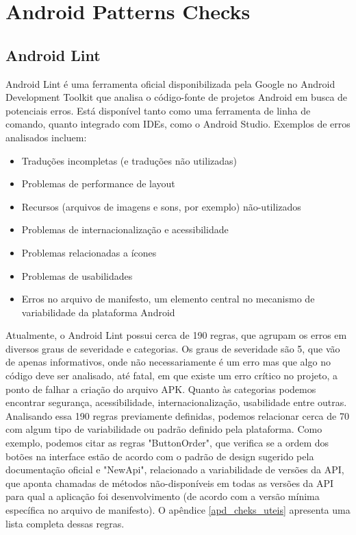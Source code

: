 \chapter{Android Patterns Checks}
\label{android_lint}
\section{Android Lint}

Android Lint é uma ferramenta oficial disponibilizada pela Google no Android 
Development Toolkit que analisa o código-fonte de projetos Android em busca de 
potenciais erros. Está disponível tanto como uma ferramenta de linha de comando, 
quanto integrado com IDEs, como o Android Studio. Exemplos de erros analisados incluem:

\begin{itemize}
  \item{Traduções incompletas (e traduções não utilizadas)}
  \item{Problemas de performance de layout}
  \item{Recursos (arquivos de imagens e sons, por exemplo) não-utilizados}
  \item{Problemas de internacionalização e acessibilidade}
  \item{Problemas relacionadas a ícones}
  \item{Problemas de usabilidades}
  \item{Erros no arquivo de manifesto, um elemento central no mecanismo de variabilidade
  da plataforma Android \cite{mechanisms}}
\end{itemize}

Atualmente, o Android Lint possui cerca de 190 regras, que agrupam os erros em 
diversos graus de severidade e categorias. Os graus de severidade são 5, que vão 
de apenas informativos, onde não necessariamente é um erro mas que algo no código 
deve ser analisado, até fatal, em que existe um erro crítico no projeto, a ponto 
de falhar a criação do arquivo APK. Quanto às categorias podemos encontrar segurança, 
acessibilidade, internacionalização, usabilidade entre outras. Analisando essa 190 
regras previamente definidas, podemos relacionar cerca de 70 com algum tipo de 
variabilidade ou padrão definido pela plataforma. Como exemplo, podemos citar as 
regras "ButtonOrder", que verifica se a ordem dos botões na interface estão de 
acordo com o padrão de design sugerido pela documentação oficial e "NewApi", 
relacionado a variabilidade de versões da API, que aponta chamadas de métodos 
não-disponíveis em todas as versões da API para qual a aplicação foi desenvolvimento 
(de acordo com a versão mínima específica no arquivo de manifesto). O apêndice 
\ref{apd_cheks_uteis} apresenta uma lista completa dessas regras. 

